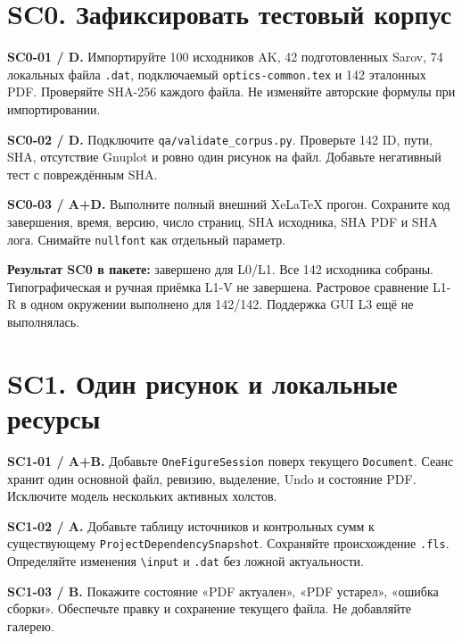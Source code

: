 \documentclass[11pt,a4paper,oneside]{scrreprt}
\begin{document}
\section{SC0. Зафиксировать тестовый корпус}\label{sc0.-ux437ux430ux444ux438ux43aux441ux438ux440ux43eux432ux430ux442ux44c-ux442ux435ux441ux442ux43eux432ux44bux439-ux43aux43eux440ux43fux443ux441}

\textbf{SC0-01 / D.} Импортируйте 100 исходников AK, 42 подготовленных Sarov, 74 локальных файла \texttt{.dat}, подключаемый \texttt{optics-common.tex} и 142 эталонных PDF. Проверяйте SHA-256 каждого файла. Не изменяйте авторские формулы при импортировании.

\textbf{SC0-02 / D.} Подключите \texttt{qa/validate\_corpus.py}. Проверьте 142 ID, пути, SHA, отсутствие Gnuplot и ровно один рисунок на файл. Добавьте негативный тест с повреждённым SHA.

\textbf{SC0-03 / A+D.} Выполните полный внешний XeLaTeX прогон. Сохраните код завершения, время, версию, число страниц, SHA исходника, SHA PDF и SHA лога. Снимайте \texttt{nullfont} как отдельный параметр.

\textbf{Результат SC0 в пакете:} завершено для L0/L1. Все 142 исходника собраны. Типографическая и ручная приёмка L1-V не завершена. Растровое сравнение L1-R в одном окружении выполнено для 142/142. Поддержка GUI L3 ещё не выполнялась.

\section{SC1. Один рисунок и локальные ресурсы}\label{sc1.-ux43eux434ux438ux43d-ux440ux438ux441ux443ux43dux43eux43a-ux438-ux43bux43eux43aux430ux43bux44cux43dux44bux435-ux440ux435ux441ux443ux440ux441ux44b}

\textbf{SC1-01 / A+B.} Добавьте \texttt{OneFigureSession} поверх текущего \texttt{Document}. Сеанс хранит один основной файл, ревизию, выделение, Undo и состояние PDF. Исключите модель нескольких активных холстов.

\textbf{SC1-02 / A.} Добавьте таблицу источников и контрольных сумм к существующему \texttt{ProjectDependencySnapshot}. Сохраняйте происхождение \texttt{.fls}. Определяйте изменения \texttt{\textbackslash{}input} и \texttt{.dat} без ложной актуальности.

\textbf{SC1-03 / B.} Покажите состояние «PDF актуален», «PDF устарел», «ошибка сборки». Обеспечьте правку и сохранение текущего файла. Не добавляйте галерею.
\end{document}
